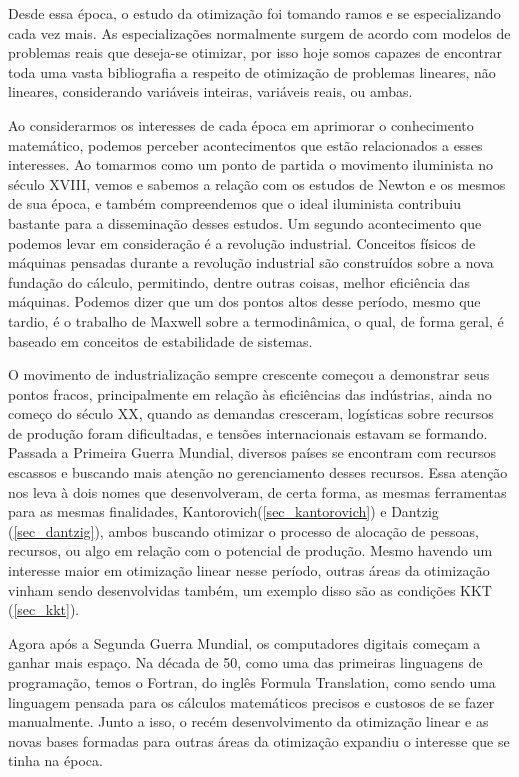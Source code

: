 Desde essa época, o estudo da otimização foi tomando ramos e se especializando cada vez mais.
As especializações normalmente surgem de acordo com modelos de problemas reais que deseja-se
otimizar, por isso hoje somos capazes de encontrar toda uma vasta bibliografia a respeito de
otimização de problemas lineares, não lineares, considerando variáveis inteiras, variáveis
reais, ou ambas.

Ao considerarmos os interesses de cada época em aprimorar o conhecimento matemático, podemos
perceber acontecimentos que estão relacionados a esses interesses. Ao tomarmos como um ponto
de partida o movimento iluminista no século XVIII, vemos e sabemos a relação com os estudos
de Newton e os mesmos de sua época, e também compreendemos que o ideal iluminista contribuiu
bastante para a disseminação desses estudos. Um segundo acontecimento que podemos levar em
consideração é a revolução industrial. Conceitos físicos de máquinas pensadas durante a
revolução industrial são construídos sobre a nova fundação do cálculo, permitindo, dentre
outras coisas, melhor eficiência das máquinas. Podemos dizer que um dos pontos altos desse
período, mesmo que tardio, é o trabalho de Maxwell sobre a termodinâmica, o qual, de forma
geral, é baseado em conceitos de estabilidade de sistemas.


O movimento de industrialização sempre crescente começou a demonstrar seus pontos fracos,
principalmente em relação às eficiências das indústrias, ainda no começo do século XX,
quando as demandas cresceram, logísticas sobre recursos de produção foram dificultadas,
e tensões internacionais estavam se formando. Passada a Primeira Guerra Mundial, diversos
países se encontram com recursos escassos e buscando mais atenção no gerenciamento desses
recursos. Essa atenção nos leva à dois nomes que desenvolveram, de certa forma, as mesmas
ferramentas para as mesmas finalidades, Kantorovich(\ref{sec_kantorovich}) e Dantzig
(\ref{sec_dantzig}), ambos buscando otimizar o processo de alocação de pessoas, recursos,
ou algo em relação com o potencial de produção. Mesmo havendo um interesse maior em
otimização linear nesse período, outras áreas da otimização vinham sendo desenvolvidas
também, um exemplo disso são as condições KKT (\ref{sec_kkt}).

Agora após a Segunda Guerra Mundial, os computadores digitais começam a ganhar mais espaço.
Na década de 50, como uma das primeiras linguagens de programação, temos o Fortran, do
inglês Formula Translation, como sendo uma linguagem pensada para os cálculos matemáticos
precisos e custosos de se fazer manualmente. Junto a isso, o recém desenvolvimento da otimização
linear e as novas bases formadas para outras áreas da otimização expandiu o interesse que
se tinha na época.

